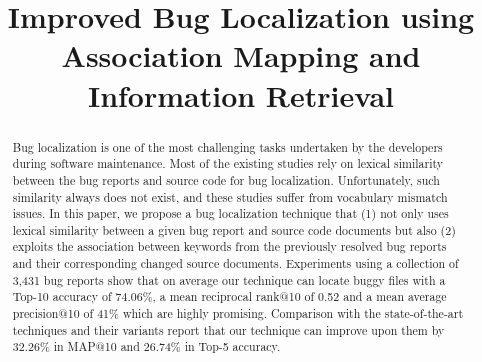 \documentclass[conference]{IEEEtran}
\begin{document}
\title{Improved Bug Localization using Association Mapping and Information Retrieval\\
}



\maketitle

\begin{abstract}
Bug localization is one of the most challenging tasks undertaken by the developers during software maintenance.
Most of the existing studies rely on lexical similarity between the bug reports and source code for bug localization.
Unfortunately, such similarity always does not exist, and these studies suffer from vocabulary mismatch issues.
In this paper, we propose a bug localization technique that (1) not only uses lexical similarity between a given bug report and source code documents  
but also (2) exploits the association between keywords from the previously resolved bug reports and their corresponding changed source documents.
Experiments using a collection of 3,431 bug reports show that on average our technique can locate buggy files with a Top-10 accuracy of 74.06\%, a mean reciprocal rank@10 of 0.52 and a mean average precision@10 of 41\% which are highly promising. 
Comparison with the state-of-the-art techniques
and their variants report that our technique can improve upon them by 32.26\% in MAP@10 and 26.74\% in Top-5 accuracy. 
\end{abstract}
\end{document}
